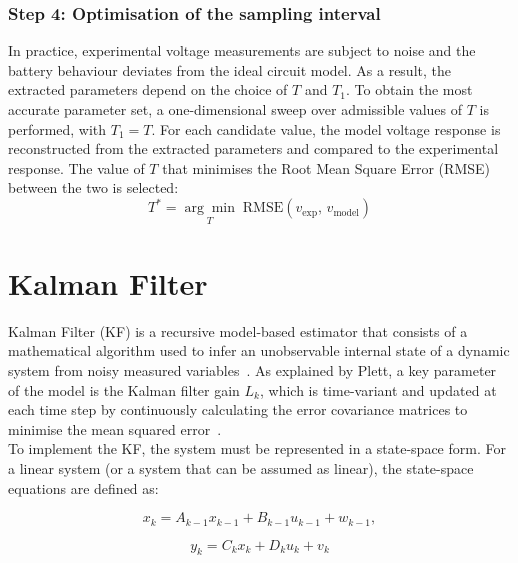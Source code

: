 \subsubsection{Step 4: Optimisation of the sampling interval}

In practice, experimental voltage measurements are subject to noise and the battery behaviour 
deviates from the ideal circuit model. As a result, the extracted parameters depend on the choice 
of $T$ and $T_1$. To obtain the most accurate parameter set, a one-dimensional sweep over 
admissible values of $T$ is 
performed, with $T_1 = T$. For each candidate value, the model voltage response is 
reconstructed from the extracted parameters and compared to the experimental response. 
The value of $T$ that minimises the Root Mean Square Error (\acs{RMSE}) between the two 
is selected:
\begin{equation}
    T^* = \underset{T}{\arg\min} \; \text{RMSE}\!\left(v_{\text{exp}},\, v_{\text{model}}\right)
    \label{eq:T_opt}
\end{equation}

\section{Kalman Filter}\label{Kalman}

Kalman Filter (\acs{KF}) is a recursive model-based estimator that consists of a mathematical algorithm used to infer an unobservable internal
state of a dynamic system from noisy measured variables~\cite{welch1995}. As explained by Plett, a key parameter of the model 
is the Kalman filter gain $L_k$, which is time-variant and updated at each time step
by continuously calculating the error covariance matrices to minimise the mean squared error~\cite{plett2015battery}.
\\
To implement the \acs{KF}, the system must be represented in a state-space form. For a linear system (or a system that can be assumed as linear),
the state-space equations are defined as:

\begin{equation}
    x_k = A_{k-1}x_{k-1} + B_{k-1}u_{k-1}+ w_{k-1},
\end{equation}

\begin{equation}
    y_k = C_k x_k + D_k u_k + v_k
\end{equation}

